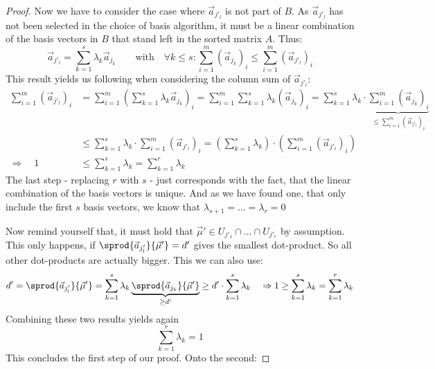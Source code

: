 \begin{proof}
    Now we have to consider the case where $\vec a_{j'_l}$ is not part of $B$. As $\vec a_{j'_l}$ has not been selected in the choice of basis algorithm, it must be a linear combination of the basis vectors in $B$ that stand left in the sorted matrix $A$. Thus:
    $$\vec a_{j'_l} = \sum_{k=1}^{s}\lambda_k\vec a_{j_k} \qquad\textrm{with}\quad \forall k \leq s\colon\sum_{i=1}^{m}(\vec a_{j_k})_i \leq \sum_{i=1}^{m}(\vec a_{j'_l})_i$$
    This result yields us following when considering the column sum of $\vec a_{j'_l}$:
    \begin{align*}
        \sum_{i=1}^{m} (\vec a_{j'_l})_i &= \sum_{i=1}^{m} \left(\sum_{k=1}^{s}\lambda_k \vec a_{j_k}\right)_i = \sum_{i=1}^{m} \sum_{k=1}^{s}\lambda_k \left(\vec a_{j_k}\right)_i = \sum_{k=1}^{s} \lambda_k \cdot\underbrace{\sum_{i=1}^{m} \left(\vec a_{j_k}\right)_i}_{\leq \sum_{i=1}^{m} (\vec a_{j'_l})_i}\\
        &\leq \sum_{k=1}^{s} \lambda_k \cdot\sum_{i=1}^{m} (\vec a_{j'_l})_i = \left(\sum_{k=1}^{s} \lambda_k\right) \cdot\left(\sum_{i=1}^{m} (\vec a_{j'_l})_i\right)\\
        \Rightarrow\quad 1 &\leq \sum_{k=1}^{s} \lambda_k = \sum_{k=1}^{r} \lambda_k
    \end{align*}
    The last step - replacing $r$ with $s$ - just corresponds with the fact, that the linear combination of the basis vectors is unique. And as we have found one, that only include the first $s$ basis vectors, we know that $\lambda_{s+1} = \dots = \lambda_r = 0$

    Now remind yourself that, it must hold that $\vec\mu' \in U_{j'_1} \cap \dots \cap U_{j'_r}$ by assumption. This only happens, if $\sprod{\vec a_{j'_l}}{\vec\mu'} = d'$ gives the smallest dot-product. So all other dot-products are actually bigger. This we can also use:
    $$d' = \sprod{\vec a_{j'_l}}{\vec\mu'} = \sum_{k=1}^{s}\lambda_k\underbrace{\sprod{\vec a_{j_k}}{\vec\mu'}}_{\geq d'} \geq d'\cdot \sum_{k=1}^{s}\lambda_k \quad\Rightarrow 1 \geq \sum_{k=1}^{s}\lambda_k = \sum_{k=1}^{r}\lambda_k$$
    Combining these two results yields again
    $$\sum_{k=1}^{r}\lambda_k = 1$$
    This concludes the first step of our proof. Onto the second:


\end{proof}
